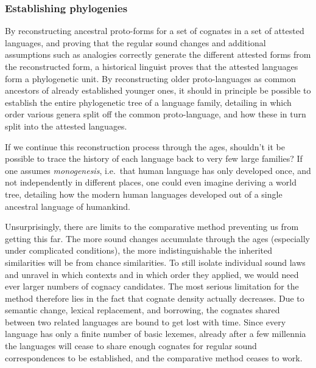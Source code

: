 \subsubsection{Establishing phylogenies}
By reconstructing ancestral proto-forms for a set of cognates in a set of attested languages, and proving that the regular sound changes and additional assumptions such as analogies correctly generate the different attested forms from the reconstructed form, a historical linguist proves that the attested languages form a phylogenetic unit. By reconstructing older proto-languages as common ancestors of already established younger ones, it should in principle be possible to establish the entire phylogenetic tree of a language family, detailing in which order various genera split off the common proto-language, and how these in turn split into the attested languages.

If we continue this reconstruction process through the ages, shouldn't it be possible to trace the history of each language back to very few large families? If one assumes \textit{monogenesis}, i.e.\ that human language has only developed once, and not independently in different places, one could even imagine deriving a world tree, detailing how the modern human languages developed out of a single ancestral language of humankind.

Unsurprisingly, there are limits to the comparative method preventing us from getting this far. The more sound changes accumulate through the ages (especially under complicated conditions), the more indistinguishable the inherited similarities will be from chance similarities. To still isolate individual sound laws and unravel in which contexts and in which order they applied, we would need ever larger numbers of cognacy candidates. The most serious limitation for the method therefore lies in the fact that cognate density actually decreases. Due to semantic change, lexical replacement, and borrowing, the cognates shared between two related languages are bound to get lost with time. Since every language has only a finite number of basic lexemes, already after a few millennia the languages will cease to share enough cognates for regular sound correspondences to be established, and the comparative method ceases to work.

